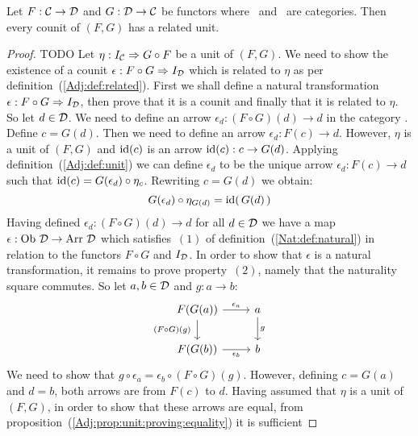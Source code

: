 \begin{prop}\label{Adj:prop:counit:has:related:unit}
    Let $F:\mbox{$\cal C$}\to\mbox{$\cal D$}$ and $G:\mbox{$\cal D$}\to\mbox{$\cal C$}$ be functors where \Cat\ and \Dat\ 
    are categories. Then every counit of $(F,G)$ has a related unit.
\end{prop}
\begin{proof}
    TODO
    Let $\eta:I_{\cal C}\Rightarrow G\circ F$ be a unit of $(F,G)$. We need to 
    show the existence of a counit $\epsilon:F\circ G\Rightarrow I_{\cal D}$ 
    which is related to $\eta$ as per definition~(\ref{Adj:def:related}).
    First we shall define a natural transformation $\epsilon:F\circ G\Rightarrow
    I_{\cal D}$, then prove that it is a counit and finally that it is related
    to $\eta$. So let $d\in\mbox{$\cal D$}$. We need to define an arrow $\epsilon_{d}:
    (F\circ G)(d)\to d$ in the category \Dat. Define $c=G(d)$. Then we need
    to define an arrow $\epsilon_{d}:F(c)\to d$. However, $\eta$ is a unit
    of $(F,G)$ and $\mbox{\rm id}(c)$ is an arrow $\mbox{\rm id}(c):c\to G(d)$. Applying
    definition~(\ref{Adj:def:unit}) we can define $\epsilon_{d}$ to be
    the unique arrow $\epsilon_{d}:F(c)\to d$ such that $\mbox{\rm id}(c)=G(\epsilon_{d})
    \circ\eta_{c}$. Rewriting $c=G(d)$ we obtain:
        \begin{equation}\label{Adj:eqn:unit:has:related:counit:1}
            G(\epsilon_{d})\circ\eta_{G(d)}=\mbox{\rm id}(\,G(d)\,)
        \end{equation}
    Having defined $\epsilon_{d}:(F\circ G)(d)\to d$ for all $d\in\mbox{$\cal D$}$ we have 
    a map $\epsilon:\mbox{\rm Ob}\ \mbox{$\cal D$}\to\mbox{\rm Arr}\ \mbox{$\cal D$}$ which satisfies~$(1)$ of 
    definition~(\ref{Nat:def:natural}) in relation to the functors $F\circ G$
    and $I_{\cal D}$. In order to show that $\epsilon$ is a natural 
    transformation, it remains to prove property~$(2)$, namely that the 
    naturality square commutes. So let $a,b\in\mbox{$\cal D$}$ and $g:a\to b$:
    \[
        \begin{tikzcd}
            F(G(a))\arrow[r, "\epsilon_{a}"]\arrow[d, swap,"(F\circ G)(g)\ "]
            &a\arrow[d, "g"]
            \\
            F(G(b))\arrow[r, swap, "\epsilon_{b}"]
            &b
        \end{tikzcd}
    \]
    We need to show that $g\circ\epsilon_{a}=\epsilon_{b}\circ(F\circ G)(g)$.
    However, defining $c=G(a)$ and $d=b$, both arrows are from $F(c)$ to $d$.
    Having assumed that $\eta$ is a unit of $(F,G)$, in order to show that
    these arrows are equal, 
    from proposition~(\ref{Adj:prop:unit:proving:equality}) it is sufficient

\end{proof}
